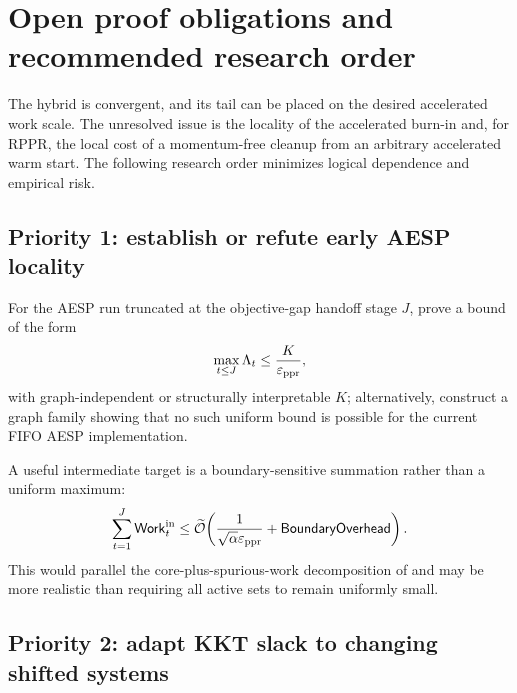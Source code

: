 \section{Open proof obligations and recommended research order}
\label{sec:open-problems}

The hybrid is convergent, and its tail can be placed on the desired accelerated
work scale.  The unresolved issue is the locality of the accelerated burn-in
and, for RPPR, the local cost of a momentum-free cleanup from an arbitrary
accelerated warm start.  The following research order minimizes logical
dependence and empirical risk.

\subsection{Priority 1: establish or refute early AESP locality}

\begin{problem}
\label{prob:early-locality}
For the AESP run truncated at the objective-gap handoff stage \(J\), prove a
bound of the form
\begin{equation}
    \max_{t\leq J}\Lambda_t
    \leq\frac{K}{\varepsilon_{\mathrm{ppr}}},
    \label{eq:open-early-locality}
\end{equation}
with graph-independent or structurally interpretable \(K\); alternatively,
construct a graph family showing that no such uniform bound is possible for
the current FIFO AESP implementation.
\end{problem}

A useful intermediate target is a boundary-sensitive summation rather than a
uniform maximum:
\begin{equation}
    \sum_{t=1}^{J}\mathsf{Work}_t^{\rm in}
    \leq
    \widetilde{\mathcal O}\!\left(
       \frac{1}{\sqrt\alpha\varepsilon_{\mathrm{ppr}}}
       +\mathsf{BoundaryOverhead}
    \right).
    \label{eq:boundary-sensitive-target}
\end{equation}
This would parallel the core-plus-spurious-work decomposition of
\citet{fountoulakis2026complexity} and may be more realistic than requiring
all active sets to remain uniformly small.

\subsection{Priority 2: adapt KKT slack to changing shifted systems}

